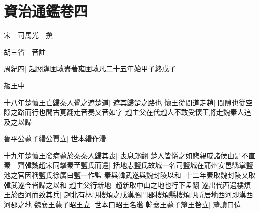 \chapter{資治通鑑卷四}
宋　司馬光　撰

胡三省　音註

周紀四|{
	起閼逢困敦盡著雍困敦凡二十五年始甲子終戊子}


赧王中

十八年楚懷王亡歸秦人覺之遮楚道|{
	遮其歸楚之路也}
懷王從間道走趙|{
	間隙也從空隙之路而行也間古莧翻走音奏又音如字}
趙主父在代趙人不敢受懷王將走魏秦人追及之以歸

魯平公薨子緡公賈立|{
	世本緡作湣}


十九年楚懷王發病薨於秦秦人歸其喪|{
	喪息郎翻}
楚人皆憐之如悲親戚諸侯由是不直秦　齊韓魏趙宋同擊秦至鹽氏而還|{
	括地志鹽氏故城一名司鹽城在蒲州安邑縣掌鹽池之官因稱鹽氏徐廣曰鹽一作監}
秦與韓武遂與魏封陵以和|{
	十二年秦取魏封陵又取韓武遂今皆歸之以和}
趙主父行新地|{
	趙新取中山之地也行下孟翻}
遂出代西遇樓煩王於西河而致其兵|{
	趙北有林胡樓煩之戌漢鴈門郡樓煩縣樓煩胡所居地西河即漢西河郡之地}
魏襄王薨子昭王立|{
	世本曰昭王名遫}
韓襄王薨子釐王咎立|{
	釐讀曰僖}


